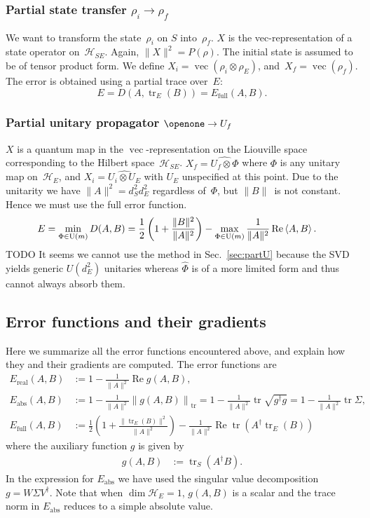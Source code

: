 \documentclass[aps, pra, a4paper, longbibliography, superscriptaddress]{revtex4-1}
\newcommand{\I}{\openone}
\newcommand{\be}{\begin{equation}}
\newcommand{\ee}{\end{equation}}
\newcommand{\inprod}[2]{\left\langle #1, #2 \right\rangle}
\newcommand{\hilb}[1]{\mathcal{#1}}
\DeclareMathOperator{\tr}{tr}
\DeclareMathOperator{\re}{Re}
\DeclareMathOperator{\cvec}{vec}
\newcommand{\vecop}[1]{\widehat{#1}}
\begin{document}
\subsubsection{Partial state transfer $\rho_i \to \rho_f$}

We want to transform the state~$\rho_i$ on $S$ into~$\rho_f$.
$X$ is the vec-representation of a state operator on~$\hilb{H}_{SE}$.
Again, $\|X\|^2 = P(\rho)$.
The initial state is assumed to be of tensor product form.
We define $X_i = \cvec(\rho_i \otimes \rho_E)$,
and~$X_f = \cvec(\rho_f)$.
The error is obtained using a partial trace over~$E$:
\be
E
= D(A, \tr_E(B))
= E_\text{full}(A, B).
\ee


\subsubsection{Partial unitary propagator $\I \to U_f$}

$X$ is a quantum map in the $\cvec$-representation on the Liouville
space corresponding to the Hilbert space~$\hilb{H}_{SE}$.
$X_f = \vecop{U_f \otimes \Phi}$
where $\Phi$ is any unitary map on~$\hilb{H}_E$, and
$X_i = \vecop{U_i \otimes U_E}$ with $U_E$ unspecified at this point.
Due to the unitarity we have $\|A\|^2 = d_S^2 d_E^2$ regardless of~$\Phi$,
but $\|B\|$~is not constant. Hence we must use the full error function.
\begin{align}
\notag
E
&= \min_{\Phi \in \text{U}(m)} D(A, B)
= \frac{1}{2}\left(1 +\frac{\|B\|^2}{\|A\|^2}\right)
-\max_{\Phi \in \text{U}(m)} \frac{1}{\|A\|^2} \re \inprod{A}{B}.
\end{align}
TODO It seems we cannot use the method in Sec.~\ref{sec:partU}
because the SVD yields generic $U(d_E^2)$ unitaries whereas $\vecop{\Phi}$
is of a more limited form and thus cannot always absorb them.

\subsection{Error functions and their gradients}

Here we summarize all the error functions encountered above, and explain how they and their gradients are computed.
The error functions are
\begin{align}
E_\text{real}(A, B) &:= 1 -\frac{1}{\|A\|^2} \re g(A, B),\\
E_\text{abs}(A, B) &:= 1 -\frac{1}{\|A\|^2} \left\|g(A, B)\right\|_{\tr}
= 1 -\frac{1}{\|A\|^2} \tr \sqrt{g^\dagger g}
= 1 -\frac{1}{\|A\|^2} \tr \Sigma,\\
E_\text{full}(A, B) &:= \frac{1}{2}\left(1 +\frac{\|\tr_E(B)\|^2}{\|A\|^2}\right) -\frac{1}{\|A\|^2} \re \tr(A^\dagger \tr_E(B))
\end{align}
where the auxiliary function $g$ is given by
\begin{align}
g(A, B) &:= \tr_S(A^\dagger B).
\end{align}
In the expression for $E_\text{abs}$ we have used the singular value decomposition $g = W \Sigma V^\dagger$.
Note that when $\dim \hilb{H}_E = 1$, $g(A,B)$ is a scalar and the trace norm in $E_\text{abs}$
reduces to a simple absolute value.
\end{document}
